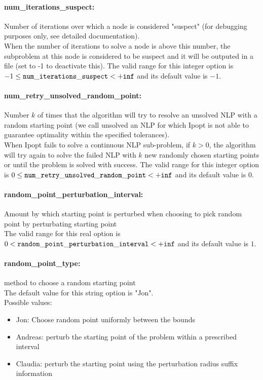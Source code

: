 \paragraph{num\_iterations\_suspect:}\label{sec:num_iterations_suspect} Number of iterations over which a node is considered "suspect" (for debugging purposes only, see detailed documentation). $\;$ \\
 When the number of iterations to solve a node is
above this number, the subproblem at this node is
considered to be suspect and it will be outputed
in a file (set to -1 to deactivate this). The valid range for this integer option is
$-1 \le {\tt num\_iterations\_suspect } <  {\tt +inf}$
and its default value is $-1$.


\paragraph{num\_retry\_unsolved\_random\_point:}\label{sec:num_retry_unsolved_random_point} Number $k$ of times that the algorithm will try to resolve an unsolved NLP with a random starting point (we call unsolved an NLP for which Ipopt is not able to guarantee optimality within the specified tolerances). $\;$ \\
 When Ipopt fails to solve a continuous NLP
sub-problem, if $k > 0$, the algorithm will try
again to solve the failed NLP with $k$ new
randomly chosen starting points  or until the
problem is solved with success. The valid range for this integer option is
$0 \le {\tt num\_retry\_unsolved\_random\_point } <  {\tt +inf}$
and its default value is $0$.


\paragraph{random\_point\_perturbation\_interval:}\label{sec:random_point_perturbation_interval} Amount by which starting point is perturbed when choosing to pick random point by perturbating starting point $\;$ \\
 The valid range for this real option is 
$0 <  {\tt random\_point\_perturbation\_interval } <  {\tt +inf}$
and its default value is $1$.


\paragraph{random\_point\_type:}\label{sec:random_point_type} method to choose a random starting point $\;$ \\
The default value for this string option is "Jon".
\\ 
Possible values:
\begin{itemize}
   \item Jon: Choose random point uniformly between the bounds
   \item Andreas: perturb the starting point of the problem
within a prescribed interval
   \item Claudia: perturb the starting point using the
perturbation radius suffix information
\end{itemize}

